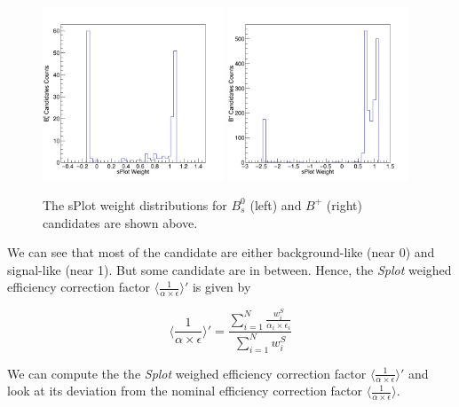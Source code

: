 \begin{figure}[h]
\begin{center}
\includegraphics[width= 0.48\textwidth]{Figures/Chapter5/Bs_sPLOTEffDistribution.png}
\includegraphics[width= 0.48\textwidth]{Figures/Chapter5/BP_sPLOTEffDistribution.png}
\caption{The sPlot weight distributions for $B_s^0$ (left) and $B^+$ (right) candidates are shown above.}
\label{fig:sPlotEffWeight}
\end{center}
\end{figure}

We can see that most of the candidate are either background-like (near 0) and signal-like (near 1). But some candidate are in between. Hence, the \textit{Splot} weighed efficiency correction factor $\langle\frac{1}{\alpha \times \epsilon} \rangle'$ is given by

\begin{equation}
\langle\frac{1}{\alpha \times \epsilon} \rangle' = \frac{\sum_{i = 1}^{N} \frac{w^S_i}{\alpha_i \times \epsilon_i}}{\sum_{i = 1}^{N}  w^S_i}
\end{equation}

We can compute the the \textit{Splot} weighed efficiency correction factor $\langle\frac{1}{\alpha \times \epsilon} \rangle'$ and look at its deviation from the nominal efficiency correction factor $\langle\frac{1}{\alpha \times \epsilon} \rangle$. 


